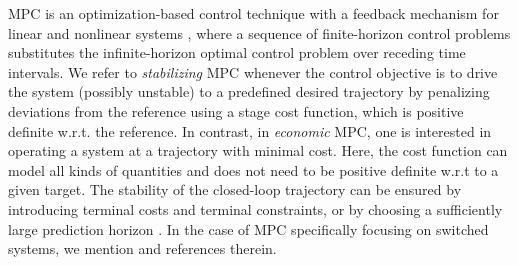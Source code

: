 \documentclass[reqno]{amsart}
\newcommand{\abbr}[1]{\textsf{#1}\xspace}
\newcommand{\MPC}{\abbr{MPC}}
\begin{document}
\MPC is an optimization-based control technique with a feedback mechanism for linear and nonlinear systems \cite{grune2017nonlinear}, where a sequence of finite-horizon control problems substitutes the infinite-horizon optimal control problem over receding time intervals. We refer to \emph{stabilizing} \MPC whenever the control objective is to drive the system (possibly unstable) to a predefined desired trajectory by penalizing deviations from the reference using a stage cost function, which is positive definite w.r.t. the reference. In contrast, in \emph{economic} \MPC, one is interested in operating a system at a trajectory with minimal cost. Here, the cost function can model all kinds of quantities and does not need to be positive definite w.r.t to a given target. The stability of the closed-loop trajectory can be ensured by introducing terminal costs and terminal constraints, or by choosing a sufficiently large prediction horizon \cite{grune2017nonlinear,mayne2000constrained,azmi2019hybrid}. In the case of \MPC specifically focusing on switched systems, we mention \cite{10050718,qi2021model,10598629,ZhangB13} and references therein.
%
\end{document}
